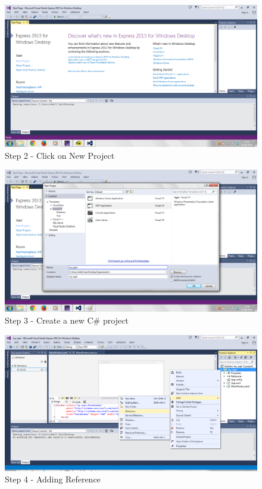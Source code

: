 \begin{flushleft}
\medskip
\begin{figure}
\begin{center}
\includegraphics[scale=0.5]{s2}
\end{center}
\caption{Step 2 - Click on New Project}
\label{fig:e2}
\end{figure}
\medskip

\begin{figure}
\begin{center}
\includegraphics[scale=0.5]{s3}
\end{center}
\caption{Step 3 - Create a new C\# project}
\label{fig:e3}
\end{figure}

\medskip
\begin{figure}
\begin{center}
\includegraphics[scale=0.5]{s4}
\end{center}
\caption{Step 4 - Adding Reference}
\label{fig:e4}
\end{figure}


\end{flushleft}
